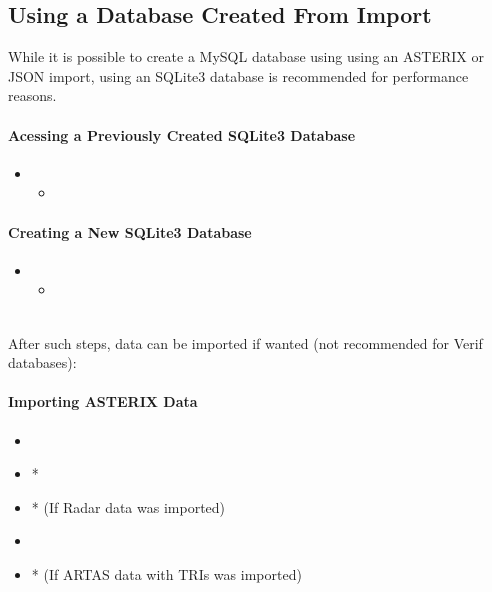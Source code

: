 \subsection{Using a Database Created From Import}

While it is possible to create a MySQL database using using an ASTERIX or JSON import, using an SQLite3 database is recommended for performance reasons.

\paragraph{Acessing a Previously Created SQLite3 Database} 

\begin{itemize}
\item {}
\begin{itemize}
 \item {}
 \end{itemize}
 \end{itemize}

\paragraph{Creating a New SQLite3 Database}

\begin{itemize}
\item {}
\begin{itemize}
 \item {}
\end{itemize}
\end{itemize}
\ \\

After such steps, data can be imported if wanted (not recommended for Verif databases):

\paragraph{Importing ASTERIX Data} 

\begin{itemize}
 \item {}
 \item {}*
 \item {}* (If Radar data was imported)
 \item {}
 \item {}* (If ARTAS data with TRIs was imported)
\end{itemize}

